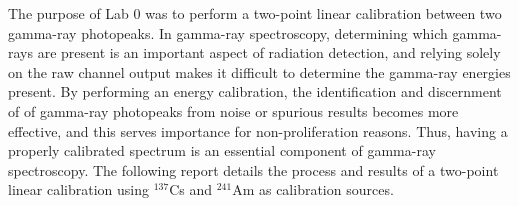 The purpose of Lab 0 was to perform a two-point linear calibration between two gamma-ray photopeaks.
In gamma-ray spectroscopy, determining which gamma-rays are present is an important aspect of
radiation detection, and relying solely on the raw channel output makes it difficult to determine the gamma-ray energies
present. By performing an energy calibration, the identification and discernment of
of gamma-ray photopeaks from noise or spurious results becomes more effective, and this serves
importance for non-proliferation reasons. Thus, having
a properly calibrated spectrum is an essential component of gamma-ray spectroscopy.
The following report details the process and results of a two-point linear calibration using $^{137}$Cs and $^{241}$Am as
calibration sources.

